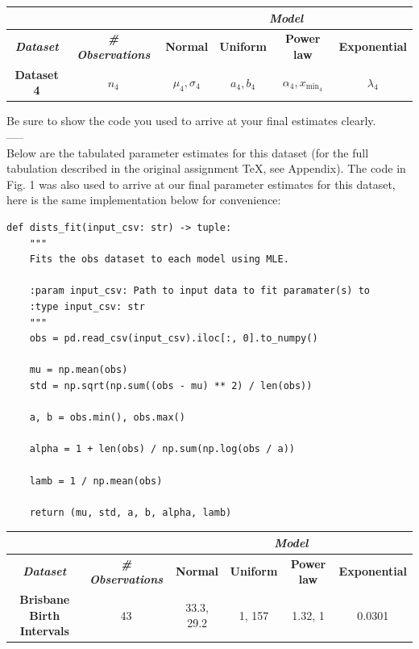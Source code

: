 \begin{center}
\begin{tabular}{|c|c|c|c|c|c|}
\hline
& & \multicolumn{4}{c|}{{\bf{\em{Model}}}}\\
\hline
{{\bf{\em{Dataset}}}} & {\bf{\em{\# Observations}}} &\textbf{Normal}& \textbf{Uniform} & \textbf{Power law} & \textbf{Exponential} \\
\hline
\textbf{Dataset 4} & $n_4$ & $\mu_4, \sigma_4$ & $a_4, b_4$ & $\alpha_4, x_{\min_4}$ & $\lambda_4$ \\
\hline
\end{tabular}
\end{center}

Be sure to show the code you used to arrive at your final estimates clearly.\\
-----\\
Below are the tabulated parameter estimates for this dataset (for the full tabulation described in the original assignment TeX, see Appendix). The code in Fig. 1 was also used to arrive at our final parameter estimates for this dataset, here is the same implementation below for convenience:\\
\begin{verbatim}
def dists_fit(input_csv: str) -> tuple:
    """
    Fits the obs dataset to each model using MLE.

    :param input_csv: Path to input data to fit paramater(s) to
    :type input_csv: str
    """
    obs = pd.read_csv(input_csv).iloc[:, 0].to_numpy()

    mu = np.mean(obs)
    std = np.sqrt(np.sum((obs - mu) ** 2) / len(obs))

    a, b = obs.min(), obs.max()

    alpha = 1 + len(obs) / np.sum(np.log(obs / a))

    lamb = 1 / np.mean(obs)

    return (mu, std, a, b, alpha, lamb)
\end{verbatim}

\vspace{4pt}

\begin{center}
\begin{tabular}{|c|c|c|c|c|c|}
\hline
& & \multicolumn{4}{c|}{{\bf{\em{Model}}}}\\
\hline
{{\bf{\em{Dataset}}}} & {\bf{\em{\# Observations}}} &\textbf{Normal}& \textbf{Uniform} & \textbf{Power law} & \textbf{Exponential} \\
\hline
\textbf{Brisbane Birth Intervals} & 43 & 33.3, 29.2 & 1, 157 & 1.32, 1 & 0.0301 \\
\hline
\end{tabular}
\end{center}

